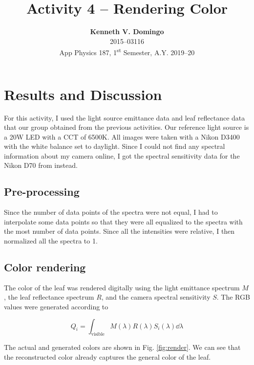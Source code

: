 \documentclass[12pt,a4paper]{article}
\newcommand{\activity}{Activity 4 -- Rendering Color}
\begin{document}
\title{\TitleFont \activity}
\author[ ]{\textbf{Kenneth V. Domingo} \\
2015--03116 \\
App Physics 187, 1\textsuperscript{st} Semester, A.Y. 2019--20}

\maketitle
\thispagestyle{titlestyle}

\section*{Results and Discussion}
\setcounter{section}{1}

For this activity, I used the light source emittance data and leaf reflectance data that our group obtained from the previous activities. Our reference light source is a 20W LED with a CCT of 6500K. All images were taken with a Nikon D3400 with the white balance set to daylight. Since I could not find any spectral information about my camera online, I got the spectral sensitivity data for the Nikon D70 from \cite{naelab} instead.

\subsection{Pre-processing}
Since the number of data points of the spectra were not equal, I had to interpolate some data points so that they were all equalized to the spectra with the most number of data points. Since all the intensities were relative, I then normalized all the spectra to 1.

\subsection{Color rendering}
The color of the leaf was rendered digitally using the light emittance spectrum $M$, the leaf reflectance spectrum $R$, and the camera spectral sensitivity $S$. The RGB values were generated according to \cite{soriano}

\begin{equation}\label{eq:sensor-model}
	Q_i = \int_{\mathrm{visible}} M(\lambda) R(\lambda) S_i(\lambda) \dd{\lambda}
\end{equation}

\noindent
The actual and generated colors are shown in Fig. \ref{fig:render}. We can see that the reconstructed color already captures the general color of the leaf.
\end{document}

